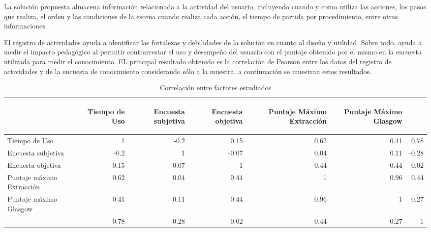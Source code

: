 La solución propuesta almacena información relacionada a la actividad del
usuario, incluyendo cuando y como utiliza las acciones, los pasos que realiza,
el orden y las condiciones de la escena cuando realiza cada acción, el tiempo de
partida por procedimiento, entre otras informaciones.

El registro de actividades ayuda a identificar las  fortalezas y debilidades de
la solución en cuanto al diseño y utilidad. Sobre todo, ayuda a medir el impacto
pedagógico al permitir contrarrestar el uso y desempeño del usuario con el
puntaje obtenido por el mismo en la encuesta utilizada para medir el
conocimiento. EL principal resultado obtenido es la correlación de Pearson
\cite{BoslaughStatistics2008} entre los datos del registro de actividades y de
la encuesta de conocimiento considerando sólo a la muestra, a continuación se
muestran estos resultados.

\begin{table}[H]
\centering
\caption{Correlación entre factores estudiados} 
\begin{tabular}{lrrrrrr}
\toprule
        &
\begin{sideways}\textbf{Tiempo de Uso}\end{sideways}             &
\begin{sideways}\textbf{Encuesta subjetiva}\end{sideways}        &
\begin{sideways}\textbf{Encuesta objetiva}\end{sideways}         &
\begin{sideways}\textbf{Puntaje Máximo Extracción}\end{sideways} &
\begin{sideways}\textbf{Puntaje Máximo Glasgow}\end{sideways}    \\
\midrule
Tiempo de Uso             & 1    & -0.2  & 0.15  & 0.62 & 0.41 & 0.78 \\
Encuesta subjetiva        & -0.2 & 1     & -0.07 & 0.04 & 0.11 & -0.28\\
Encuesta objetiva         & 0.15 & -0.07 & 1     & 0.44 & 0.44 & 0.02 \\
Puntaje máximo Extracción & 0.62 & 0.04  & 0.44  & 1    & 0.96 & 0.44 \\
Puntaje máximo Glasgow    & 0.41 & 0.11  & 0.44  & 0.96 & 1    & 0.27 \\
\bottomrule               & 0.78 & -0.28 & 0.02  & 0.44 & 0.27 & 1    \\
\end{tabular}

\label{tab:all_correlation}
\end{table}

